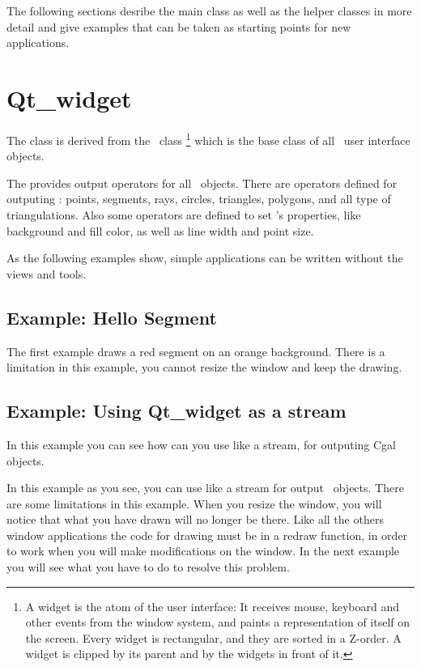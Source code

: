 The following sections desribe the main class as well as the helper classes
in more detail and give examples that can be taken as starting points for
new applications.


\section{Qt\_widget}
\label{Qt_widget}

The class  is derived from the \qt\ class %
\footnote{A widget is the atom of the user interface: It receives mouse, keyboard and other 
events from the window system, and paints a representation of itself on the 
screen. Every widget is rectangular, and they are sorted in a Z-order. A 
widget is clipped by its parent and by the widgets in front of it.} 
which is the base class of all \qt\ user interface objects. 


The  provides output operators for all \cgal\ objects. There are 
operators defined for outputing : points, segments, rays, circles, triangles, 
polygons, and all type of triangulations. Also some operators are defined to 
set 's properties, like background and fill color, as well as line
width and point size.

As the following examples show, simple applications can be written
without the views and tools.

\subsection{Example: Hello Segment}
The first example draws a red segment on an orange background.
There is a limitation in this example, you cannot resize the window and keep the drawing.

\subsection{Example: Using Qt\_widget as a stream}

In this example you can see how can you use  like a stream, for outputing Cgal objects.


In this example as you see, you can use  like a stream for output \cgal\ objects.
 There are some limitations in this example. When you resize the window, you will notice that what you have drawn will no longer be there. Like all
the others window applications the code for drawing must be in a redraw function, in order
to work when you will make modifications on the window. In the next example you will see what you have to do to resolve this problem.

